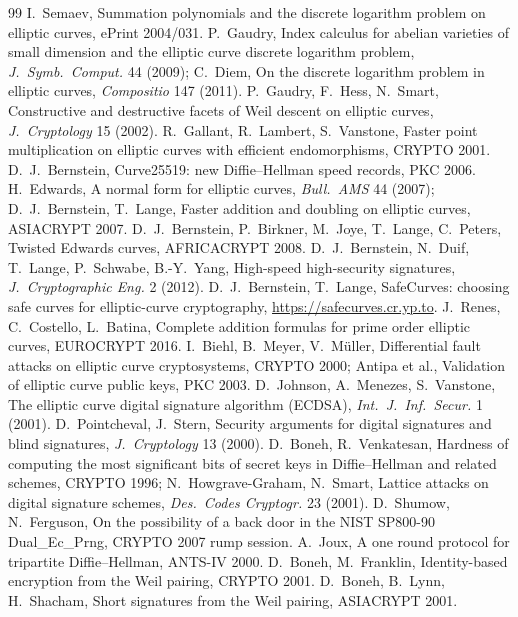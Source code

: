 \documentclass[11pt,a4paper,oneside]{book}
\theoremstyle{plain}
\theoremstyle{definition}
\theoremstyle{remark}
\begin{document}
\begin{thebibliography}{99}
 I.~Semaev, Summation polynomials and the discrete logarithm problem on elliptic curves, ePrint 2004/031.
 P.~Gaudry, Index calculus for abelian varieties of small dimension and the elliptic curve discrete logarithm problem, \emph{J.\ Symb.\ Comput.} 44 (2009); C.~Diem, On the discrete logarithm problem in elliptic curves, \emph{Compositio} 147 (2011).
 P.~Gaudry, F.~Hess, N.~Smart, Constructive and destructive facets of Weil descent on elliptic curves, \emph{J.\ Cryptology} 15 (2002).
 R.~Gallant, R.~Lambert, S.~Vanstone, Faster point multiplication on elliptic curves with efficient endomorphisms, CRYPTO 2001.
 D.~J.~Bernstein, Curve25519: new Diffie--Hellman speed records, PKC 2006.
 H.~Edwards, A normal form for elliptic curves, \emph{Bull.\ AMS} 44 (2007); D.~J.~Bernstein, T.~Lange, Faster addition and doubling on elliptic curves, ASIACRYPT 2007.
 D.~J.~Bernstein, P.~Birkner, M.~Joye, T.~Lange, C.~Peters, Twisted Edwards curves, AFRICACRYPT 2008.
 D.~J.~Bernstein, N.~Duif, T.~Lange, P.~Schwabe, B.-Y.~Yang, High-speed high-security signatures, \emph{J.\ Cryptographic Eng.} 2 (2012).
 D.~J.~Bernstein, T.~Lange, SafeCurves: choosing safe curves for elliptic-curve cryptography, \url{https://safecurves.cr.yp.to}.
 J.~Renes, C.~Costello, L.~Batina, Complete addition formulas for prime order elliptic curves, EUROCRYPT 2016.
 I.~Biehl, B.~Meyer, V.~M\"uller, Differential fault attacks on elliptic curve cryptosystems, CRYPTO 2000; Antipa et al., Validation of elliptic curve public keys, PKC 2003.
 D.~Johnson, A.~Menezes, S.~Vanstone, The elliptic curve digital signature algorithm (ECDSA), \emph{Int.\ J.\ Inf.\ Secur.} 1 (2001).
 D.~Pointcheval, J.~Stern, Security arguments for digital signatures and blind signatures, \emph{J.\ Cryptology} 13 (2000).
 D.~Boneh, R.~Venkatesan, Hardness of computing the most significant bits of secret keys in Diffie--Hellman and related schemes, CRYPTO 1996; N.~Howgrave-Graham, N.~Smart, Lattice attacks on digital signature schemes, \emph{Des.\ Codes Cryptogr.} 23 (2001).
 D.~Shumow, N.~Ferguson, On the possibility of a back door in the NIST SP800-90 Dual\_Ec\_Prng, CRYPTO 2007 rump session.
 A.~Joux, A one round protocol for tripartite Diffie--Hellman, ANTS-IV 2000.
 D.~Boneh, M.~Franklin, Identity-based encryption from the Weil pairing, CRYPTO 2001.
 D.~Boneh, B.~Lynn, H.~Shacham, Short signatures from the Weil pairing, ASIACRYPT 2001.

\end{thebibliography}
\end{document}
